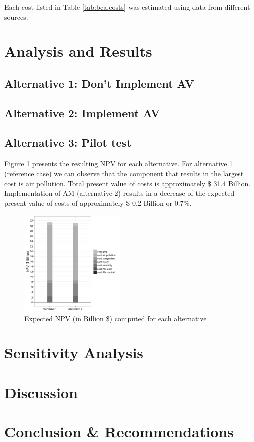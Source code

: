 \documentclass[11pt, letterpaper]{article}
\begin{document}
Each cost listed in Table \ref{tab:bca.costs} was estimated using data from different sources:

\section{Analysis and Results} \label{results}


\subsection{Alternative 1: Don't Implement AV}

\subsection{Alternative 2: Implement AV}

\subsection{Alternative 3: Pilot test}

Figure \ref{fig:alt1} presents the resulting NPV for each alternative. For alternative 1 (reference case) we can observe that the component that results in the largest cost is air pollution. Total present value of costs is approximately \$ 31.4 Billion. Implementation of AM (alternative 2) results in a decrease of the expected present value of costs of approximately \$ 0.2 Billion or 0.7\%.

\begin{figure}[H]
\begin{center}
\includegraphics[width=0.45\textwidth]{../../R/barplot1}
\caption{Expected NPV (in Billion \$) computed for each alternative}
\label{fig:alt1}
\end{center}
\end{figure}

\section{Sensitivity Analysis} \label{sensitivity}


\section{Discussion} \label{discussion}


\section{Conclusion \& Recommendations} \label{conclusion}

\end{document}
